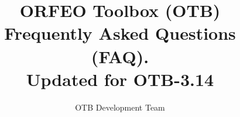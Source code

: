\documentclass[english]{article}
\begin{document}
\title{ORFEO Toolbox (OTB) Frequently Asked Questions (FAQ).\\ Updated
  for OTB-3.14}


\author{OTB Development Team}


\maketitle

\tableofcontents



%

%
\end{document}
